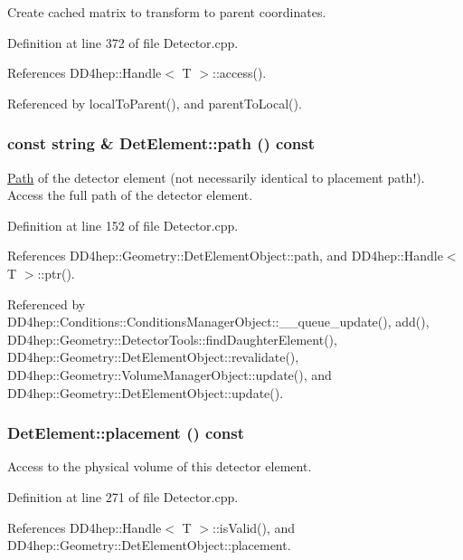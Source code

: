 Create cached matrix to transform to parent coordinates. 

Definition at line 372 of file Detector.cpp.

References DD4hep::Handle$<$ T $>$::access().

Referenced by localToParent(), and parentToLocal().\hypertarget{class_d_d4hep_1_1_geometry_1_1_det_element_a6b70a5084294e7adb2f0bd0018e3aed2}{
\subsubsection[{path}]{\setlength{\rightskip}{0pt plus 5cm}const {\bf string} \& DetElement::path () const}}
\label{class_d_d4hep_1_1_geometry_1_1_det_element_a6b70a5084294e7adb2f0bd0018e3aed2}


\hyperlink{class_d_d4hep_1_1_path}{Path} of the detector element (not necessarily identical to placement path!). Access the full path of the detector element. 

Definition at line 152 of file Detector.cpp.

References DD4hep::Geometry::DetElementObject::path, and DD4hep::Handle$<$ T $>$::ptr().

Referenced by DD4hep::Conditions::ConditionsManagerObject::\_\-\_\-queue\_\-update(), add(), DD4hep::Geometry::DetectorTools::findDaughterElement(), DD4hep::Geometry::DetElementObject::revalidate(), DD4hep::Geometry::VolumeManagerObject::update(), and DD4hep::Geometry::DetElementObject::update().\hypertarget{class_d_d4hep_1_1_geometry_1_1_det_element_a32a39fbab7eeb59dd4ad2fc807e0b66d}{
\subsubsection[{placement}]{ DetElement::placement () const}}
\label{class_d_d4hep_1_1_geometry_1_1_det_element_a32a39fbab7eeb59dd4ad2fc807e0b66d}


Access to the physical volume of this detector element. 

Definition at line 271 of file Detector.cpp.

References DD4hep::Handle$<$ T $>$::isValid(), and DD4hep::Geometry::DetElementObject::placement.

